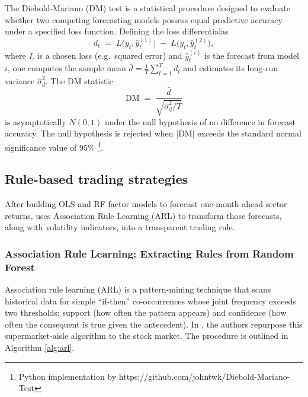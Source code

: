 The Diebold-Mariano (DM) test is a statistical procedure designed to evaluate whether two competing forecasting models possess equal predictive accuracy under a specified loss function.  Defining the loss differentialas 
\[
d_t \;=\; L\bigl(y_t,\hat y^{(1)}_t\bigr)\;-\;L\bigl(y_t,\hat y^{(2)}_t\bigr),
\]
where \(L\) is a chosen loss (e.g.\ squared error) and \(\hat y^{(i)}_t\) is the forecast from model \(i\), one computes the sample mean \(\bar d = \frac{1}{T}\sum_{t=1}^T d_t\) and estimates its long-run variance \(\hat\sigma^2_d\).  The DM statistic
\[
\mathrm{DM} \;=\;\frac{\bar d}{\sqrt{\hat\sigma^2_d / T}}
\]
is asymptotically \(N(0,1)\) under the null hypothesis of no difference in forecast accuracy. The null hypothesis is rejected when \(\lvert\mathrm{DM}\rvert\) exceeds the standard normal significance value of 95\% \cite{dieman_2002} \footnote{Python implementation by https://github.com/johntwk/Diebold-Mariano-Test}.


\subsection{Rule-based trading strategies}
After building OLS and RF factor models to forecast one-month-ahead sector returns,  uses Association Rule Learning (ARL) to transform those forecasts, along with volatility indicators, into a transparent trading rule. 



\subsubsection{Association Rule Learning: Extracting Rules from Random Forest}
Association rule learning (ARL) is a pattern-mining technique that scans historical data for simple “if-then” co-occurrences whose joint frequency exceeds two thresholds: support (how often the pattern appears) and confidence (how often the consequent is true given the antecedent). In , the authors repurpose this supermarket-aisle algorithm to the stock market. The procedure is outlined in Algorithm \ref{alg:arl}.

